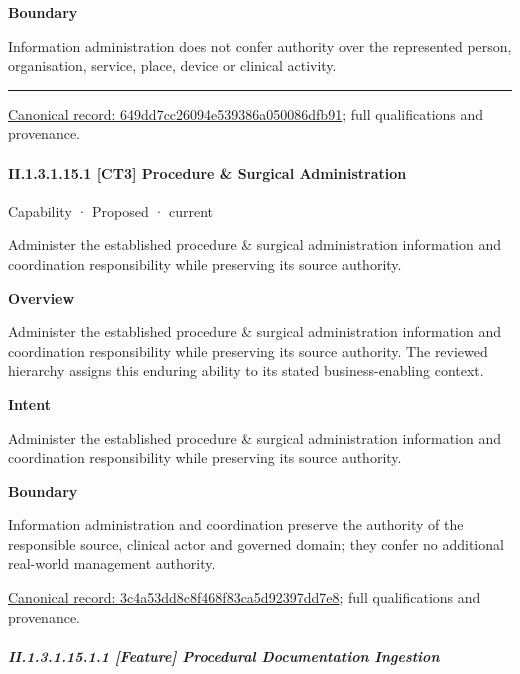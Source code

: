 \textbf{Boundary}



Information administration does not confer authority over the represented person, organisation, service, place, device or clinical activity.



\medskip\hrule\medskip

{\footnotesize \href{../../../../continuum/strategy/capability/649dd7cc26094e539386a050086dfb91.md}{Canonical record: 649dd7cc26094e539386a050086dfb91}; full qualifications and provenance.}\par
\paragraph*{II.1.3.1.15.1 [CT3] Procedure \& Surgical Administration}
\label{navigation:II.1.3.1.15.1}

\label{element:3c4a53dd8c8f468f83ca5d92397dd7e8}
{\small Capability · Proposed · current}\par

Administer the established procedure \& surgical administration information and coordination responsibility while preserving its source authority.



\textbf{Overview}



Administer the established procedure \& surgical administration information and coordination responsibility while preserving its source authority. The reviewed hierarchy assigns this enduring ability to its stated business-enabling context.



\textbf{Intent}



Administer the established procedure \& surgical administration information and coordination responsibility while preserving its source authority.



\textbf{Boundary}



Information administration and coordination preserve the authority of the responsible source, clinical actor and governed domain; they confer no additional real-world management authority.


{\footnotesize \href{../../../../continuum/strategy/capability/3c4a53dd8c8f468f83ca5d92397dd7e8.md}{Canonical record: 3c4a53dd8c8f468f83ca5d92397dd7e8}; full qualifications and provenance.}\par
\subparagraph*{II.1.3.1.15.1.1 [Feature] Procedural Documentation Ingestion}
\label{navigation:II.1.3.1.15.1.1}

